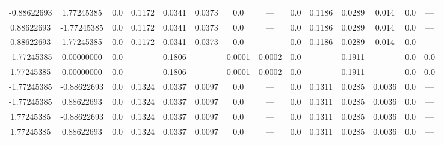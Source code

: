 \documentclass[a4paper,14pt]{extarticle}
\begin{document}
\begin{landscape}
\begin{table}[H]
\begin{tabular}{|c|c|*{6}{c}|*{6}{c}|}
-0.88622693        &  1.77245385        & 0.0    & 0.1172 & 0.0341 & 0.0373 & 0.0    & ---    & 0.0    & 0.1186 & 0.0289 & 0.014  & 0.0  & ---   \\
 0.88622693        & -1.77245385        & 0.0    & 0.1172 & 0.0341 & 0.0373 & 0.0    & ---    & 0.0    & 0.1186 & 0.0289 & 0.014  & 0.0  & ---   \\
 0.88622693        &  1.77245385        & 0.0    & 0.1172 & 0.0341 & 0.0373 & 0.0    & ---    & 0.0    & 0.1186 & 0.0289 & 0.014  & 0.0  & ---   \\
-1.77245385        &  0.00000000        & 0.0    & ---    & 0.1806 & ---    & 0.0001 & 0.0002 & 0.0    & ---    & 0.1911 & ---    & 0.0  & 0.0   \\
 1.77245385        &  0.00000000        & 0.0    & ---    & 0.1806 & ---    & 0.0001 & 0.0002 & 0.0    & ---    & 0.1911 & ---    & 0.0  & 0.0   \\
-1.77245385        & -0.88622693        & 0.0    & 0.1324 & 0.0337 & 0.0097 & 0.0    & ---    & 0.0    & 0.1311 & 0.0285 & 0.0036 & 0.0  & ---   \\
-1.77245385        &  0.88622693        & 0.0    & 0.1324 & 0.0337 & 0.0097 & 0.0    & ---    & 0.0    & 0.1311 & 0.0285 & 0.0036 & 0.0  & ---   \\
 1.77245385        & -0.88622693        & 0.0    & 0.1324 & 0.0337 & 0.0097 & 0.0    & ---    & 0.0    & 0.1311 & 0.0285 & 0.0036 & 0.0  & ---   \\
 1.77245385        &  0.88622693        & 0.0    & 0.1324 & 0.0337 & 0.0097 & 0.0    & ---    & 0.0    & 0.1311 & 0.0285 & 0.0036 & 0.0  & ---   \\
\hline
\end{tabular}
\end{table} 


\end{landscape}
\end{document}
